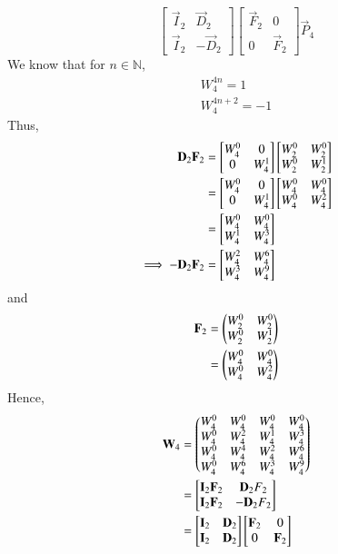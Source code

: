 \documentclass[journal,12pt,twocolumn]{IEEEtran}
\renewcommand\thesection{\arabic{section}}
\begin{document}
\begin{enumerate}[label=\thesection.\arabic*]
\begin{equation}
\begin{bmatrix}
	\vec{I}_{2} & \vec{D}_{2} \\
\vec{I}_{2} & -\vec{D}_{2}
\end{bmatrix}
\begin{bmatrix}
\vec{F}_{2} & 0 \\
0 & \vec{F}_{2}
\end{bmatrix}
\vec{P}_{4}
\label{eq:fft-recurrence}
\end{equation}
\solution We know that for $n \in \mathbb{N}$,
\begin{align}
W_4^{4n} = 1 \\
W_4^{4n + 2} = -1
\end{align}
Thus,
\begin{align}
	\mathbf{D}_2\mathbf{F}_2 &= \begin{bmatrix}W_{4}^{0} & 0 \\ 0 & W_{4}^{1}\end{bmatrix}\begin{bmatrix}W_{2}^{0} & W_{2}^{0} \\ W_{2}^{0} & W_{2}^{1}\end{bmatrix} \\
					   &= \begin{bmatrix}W_{4}^{0} & 0 \\ 0 & W_{4}^{1}\end{bmatrix}\begin{bmatrix}W_{4}^{0} & W_{4}^{0} \\ W_{4}^{0} & W_{4}^{2}\end{bmatrix} \\
					   &= \begin{bmatrix}W_{4}^{0} & W_{4}^{0} \\ W_{4}^{1} & W_{4}^{3}\end{bmatrix} \label{eq:fft-df1} \\
	\implies -\mathbf{D}_2\mathbf{F}_2 &= \begin{bmatrix}W_{4}^{2} & W_{4}^{6} \\ W_{4}^{3} & W_{4}^{9}\end{bmatrix} \label{eq:fft-df2}
\end{align}
and
\begin{align}
	\mathbf{F}_2 &= \begin{pmatrix}W_{2}^{0} & W_{2}^{0} \\ W_{2}^{0} & W_{2}^{1}\end{pmatrix} \\
			  &= \begin{pmatrix}W_{4}^{0} & W_{4}^{0} \\ W_{4}^{0} & W_{4}^{2}\end{pmatrix}
\end{align}
Hence,
\begin{align}
	\vec{W}_4 &= \myvec{\w{4}{0} & \w{4}{0} & \w{4}{0} & \w{4}{0} \\
		\w{4}{0} & \w{4}{2} & \w{4}{1} & \w{4}{3} \\
		\w{4}{0} & \w{4}{4} & \w{4}{2} & \w{4}{6} \\
		\w{4}{0} & \w{4}{6} & \w{4}{3} & \w{4}{9} 
	} \label{eq:fft-permutation} \\
	&= \mybvec{\vec{I}_2\vec{F}_2 & \vec{D}_2{F}_2 \\ \vec{I}_2\vec{F}_2 & -\vec{D}_2{F}_2} \\
	&= \mybvec{\vec{I}_2 & \vec{D}_2 \\ \vec{I}_2 & \vec{D}_2}\mybvec{\vec{F}_2 & 0 \\ 0 & \vec{F}_2}

\end{align}
\end{enumerate}
\end{document}
